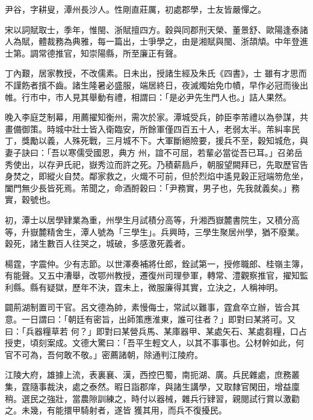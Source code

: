 \begin{pinyinscope}
 尹谷，字耕叟，潭州長沙人。性剛直莊厲，初處郡學，士友皆嚴憚之。



 宋以詞賦取士，季年，惟閩、浙賦擅四方。穀與同郡刑天榮、董景舒、歐陽逢泰諸人為賦，體裁務為典雅，每一篇出，士爭學之，由是湘賦與閩、浙頡頏。中年登進士第。調常德推官，知崇陽縣，所至廉正有聲。



 丁內艱，居家教授，不改儒素。日未出，授諸生經及朱氏《四書》，士
 雖有才思而不謹飭者擯不齒。諸生隆暑必盛服，端居終日，夜滅燭始免巾幘，早作必冠而後出帷。行市中，市人見其舉動有禮，相謂曰：「是必尹先生門人也。」詰人果然。



 晚入李庭芝制幕，用薦擢知衡州，需次於家。潭城受兵，帥臣李芾禮以為參謀，共畫備御策。時城中壯士皆入衛臨安，所餘軍僅四百五十人，老弱太半。芾糾率民丁，獎勵以義，人殊死戰，三月城不下。大軍斷絕險要，援兵不至，穀知城危，與妻子訣曰：「吾以寒儒受國恩，典方
 州，誼不可屈，若輩必當從吾已耳。」召弟岳秀使出，以存尹氏祀，嶽秀泣而許之死。乃積薪扃戶，朝服望闕拜已，先取歷官告身焚之，即縱火自焚。鄰家救之，火熾不可前，但於烈焰中遙見穀正冠端笏危坐，闔門無少長皆死焉。芾聞之，命酒酹穀曰：「尹務實，男子也，先我就義矣。」務實，穀號也。



 初，潭士以居學肄業為重，州學生月試積分高等，升湘西嶽麓書院生，又積分高等，升嶽麓精舍生，潭人號為「三學生」。兵興時，三學生聚居州學，猶不廢業。
 穀死，諸生數百人往哭之，城破，多感激死義者。



 楊霆，字震仲。少有志節。以世澤奏補將仕郎，銓試第一，授修職郎、桂嶺主簿，有能聲。又五中漕舉，改鄂州教授，遷復州司理參軍，轉常、澧觀察推官，擢知監利縣。縣有疑獄，歷年不決，霆未上，微服廉得其實，立決之，人稱神明。



 闢荊湖制置司干官。呂文德為帥，素慢侮士，常試以難事，霆倉卒立辦，皆合其意。一日謂曰：「朝廷有密旨，出師策應淮東，誰可往者？」即對曰某將可。又曰：「兵器糧草若
 何？」即對曰某營兵馬、某庫器甲、某處矢石、某處芻糧，口占授吏，頃刻案成。文德大驚曰：「吾平生輕文人，以其不事事也。公材幹如此，何官不可為，吾何敢不敬。」密薦諸朝，除通判江陵府。



 江陵大府，雄據上流，表裏襄、漢，西控巴蜀，南扼湖、廣。兵民雜處，庶務叢集，霆隨事裁決，處之泰然。暇日詣郡庠，與諸生講學，又取隸官閑田，增益廩稍。選民之強壯，當農隙訓練之，時付以器械，雜兵行肄習，親閱試行賞以激勸之。未幾，有能擐甲騎射者，遂皆
 獲其用，而兵不復擾民。




\end{pinyinscope}
